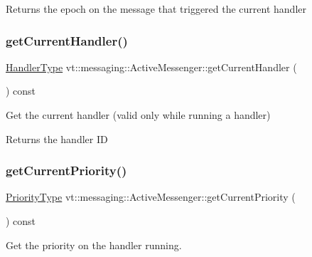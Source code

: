 \begin{DoxyReturn}{Returns}
the epoch on the message that triggered the current handler 
\end{DoxyReturn}
\mbox{\label{structvt_1_1messaging_1_1_active_messenger_a80753933950fa9619a5b675e5db291ad}} 
\subsubsection{\texorpdfstring{get\+Current\+Handler()}{getCurrentHandler()}}
{\footnotesize\ttfamily \hyperlink{namespacevt_af64846b57dfcaf104da3ef6967917573}{Handler\+Type} vt\+::messaging\+::\+Active\+Messenger\+::get\+Current\+Handler (\begin{DoxyParamCaption}{ }\end{DoxyParamCaption}) const}



Get the current handler (valid only while running a handler) 

\begin{DoxyReturn}{Returns}
the handler ID 
\end{DoxyReturn}
\mbox{\label{structvt_1_1messaging_1_1_active_messenger_a170f37d23b8cad11dac0de0dec556ef6}} 
\subsubsection{\texorpdfstring{get\+Current\+Priority()}{getCurrentPriority()}}
{\footnotesize\ttfamily \hyperlink{namespacevt_a86bff9f556eb761b27fc8600d006ac04}{Priority\+Type} vt\+::messaging\+::\+Active\+Messenger\+::get\+Current\+Priority (\begin{DoxyParamCaption}{ }\end{DoxyParamCaption}) const}



Get the priority on the handler running. 

